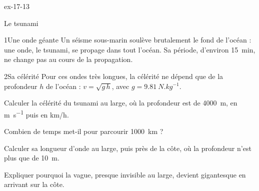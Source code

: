 \begin{blocLivre}{ex-17-13}
\begin{exercice}[3]{Le tsunami}
\begin{docu}{1}{Une onde géante}
Un séisme sous-marin soulève brutalement le fond de l'océan : une onde, le tsunami, se propage dans tout l'océan. Sa période,
d'environ \qty{15}{min}, ne change pas au cours de la propagation.
\end{docu}
\begin{docu}{2}{Sa célérité}
Pour ces ondes très longues, la célérité ne dépend que de la profondeur $h$ de l'océan : $v=\sqrt{g\,h}$, avec $g=\qty{9,81}{N.kg^{-1}}$.
\end{docu}
\begin{questions}
\item Calculer la célérité du tsunami au large, où la profondeur est de \qty{4000}{m}, en \unit{m.s^{-1}} puis en \unit{km/h}.
\item Combien de temps met-il pour parcourir \qty{1000}{km} ?
\item Calculer sa longueur d'onde au large, puis près de la côte, où la profondeur n'est plus que de \qty{10}{m}.
\item \initiative Expliquer pourquoi la vague, presque invisible au large, devient gigantesque en arrivant sur la côte.
\end{questions}
\end{exercice}
\end{blocLivre}
